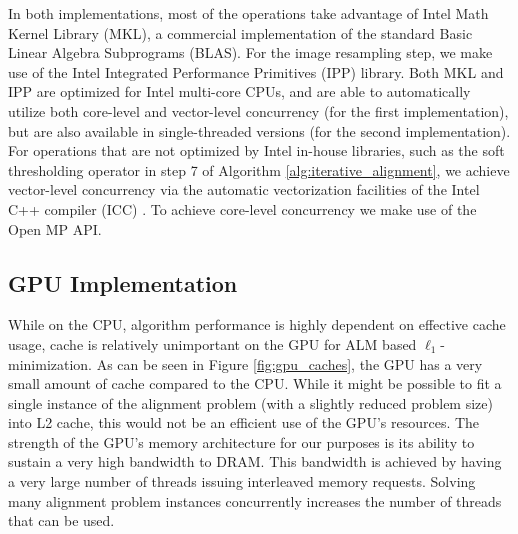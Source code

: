 In both implementations, most of the operations take
advantage of Intel Math Kernel Library (MKL), a commercial implementation of
the standard Basic Linear Algebra Subprograms (BLAS). For the image resampling
step, we make use of the Intel Integrated Performance Primitives (IPP) library.
Both MKL and IPP are optimized for Intel multi-core CPUs, and are able to
automatically utilize both core-level and vector-level concurrency (for the first implementation),
but are also available in single-threaded versions (for the second implementation). For 
operations that are not optimized by Intel in-house libraries, such as the soft thresholding
operator in step 7 of Algorithm \ref{alg:iterative_alignment}, we achieve 
vector-level concurrency via
the automatic vectorization facilities of the Intel C++ compiler (ICC) \cite{dulong1999overview}.
To achieve core-level concurrency we make use of the Open MP API. \cite{dagum2002openmp} 

\subsection{GPU Implementation} 
\label{sec:alignment_implementation_gpu}
While on the CPU, algorithm performance is highly dependent on effective
cache usage, cache is relatively unimportant on the GPU for ALM based
$\ell_1$-minimization.  As can be seen in Figure \ref{fig:gpu_caches}, the GPU has 
a very small amount of cache compared to the CPU.  While it might be possible
to fit a single instance of the alignment problem (with a slightly reduced problem size)
into L2 cache, this would not be an efficient use of the GPU's resources.
The strength of the GPU's memory architecture for our purposes is its ability to sustain a very
high bandwidth to DRAM.  This bandwidth is achieved by having a very large number of
threads issuing interleaved memory requests.  Solving many alignment problem instances
concurrently increases the number of threads that can be used.

